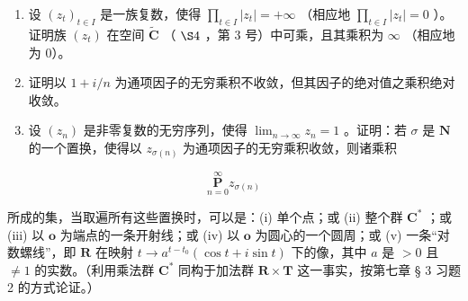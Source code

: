 \begin{enumerate}
\def\labelenumi{\arabic{enumi})}
\setcounter{enumi}{2}
\item
  设 \((z_{t})_{t\in I}\) 是一族复数，使得 \(\prod_{t\in I}|z_t| = +\infty\) （相应地 \(\prod_{t\in I}|z_t| = 0\) ）。证明族 \((z_{t})\) 在空间 \(\tilde{\mathbf{C}}\) （ \(\S 4\) ，第 3 号）中可乘，且其乘积为 \(\infty\) （相应地为 0）。
\item
  证明以 \(1 + i/n\) 为通项因子的无穷乘积不收敛，但其因子的绝对值之乘积绝对收敛。
\item
  设 \((z_{n})\) 是非零复数的无穷序列，使得 \(\lim_{n\to \infty}z_n = 1\) 。证明：若 \(\sigma\) 是 \(\mathbf{N}\) 的一个置换，使得以 \(z_{\sigma (n)}\) 为通项因子的无穷乘积收敛，则诸乘积
\end{enumerate}

\[
\underset {n = 0} {\overset {\infty} {\mathbf {P}}} z _ {\sigma (n)}
\]

所成的集，当取遍所有这些置换时，可以是：(i) 单个点；或 (ii) 整个群 \(\mathbf{C}^*\) ；或 (iii) 以 \(\mathbf{o}\) 为端点的一条开射线；或 (iv) 以 \(\mathbf{o}\) 为圆心的一个圆周；或 (v) 一条“对数螺线”，即 \(\mathbf{R}\) 在映射 \(t \to a^{t - t_0} (\cos t + i \sin t)\) 下的像，其中 \(a\) 是 \(>0\) 且 \(\neq 1\) 的实数。（利用乘法群 \(\mathbf{C}^*\) 同构于加法群 \(\mathbf{R} \times \mathbf{T}\) 这一事实，按第七章 § 3 习题 2 的方式论证。）

